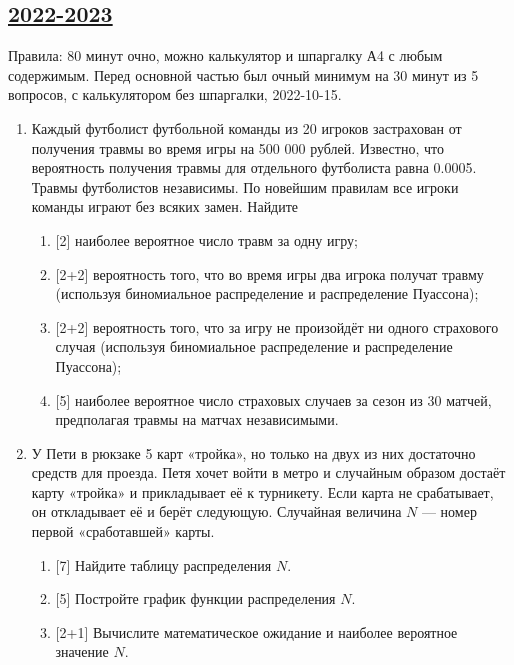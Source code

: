 \subsection[2022-2023]{\hyperref[sec:sol_kr_01_2022_2023]{2022-2023}}
\label{sec:kr_01_2022_2023} %

Правила: 80 минут очно, можно калькулятор и шпаргалку А4 с любым содержимым.
Перед основной частью был очный минимум на 30 минут из 5 вопросов, с калькулятором без шпаргалки, 2022-10-15.


\begin{enumerate}
\item Каждый футболист футбольной команды из 20 игроков застрахован от получения травмы во время игры на 500 000 рублей. 
Известно, что вероятность получения травмы для отдельного футболиста равна 0.0005. 
Травмы футболистов независимы. По новейшим правилам все игроки команды играют без всяких замен. 
Найдите 
\begin{enumerate}
\item 	{[2]} наиболее вероятное число травм за одну игру;
\item 	{[2+2]} вероятность того, что во время игры два игрока получат травму (используя биномиальное распределение и распределение Пуассона);
\item 	{[2+2]} вероятность того, что за игру не произойдёт ни одного страхового случая (используя биномиальное распределение и распределение Пуассона);
\item 	{[5]} наиболее вероятное число страховых случаев за сезон из 30 матчей, предполагая травмы на матчах независимыми.
\end{enumerate}



\item У Пети в рюкзаке 5 карт «тройка», но только на двух из них достаточно средств для проезда. 
Петя хочет войти в метро и случайным образом достаёт карту «тройка» и прикладывает её к турникету. 
Если карта не срабатывает, он откладывает её и берёт следующую. 
Случайная величина $N$ — номер первой «сработавшей» карты.
\begin{enumerate}
\item {[7]} Найдите таблицу распределения $N$.
\item {[5]} Постройте график функции распределения $N$.
\item {[2+1]} Вычислите математическое ожидание и наиболее вероятное значение $N$.
\end{enumerate}



\end{enumerate}
